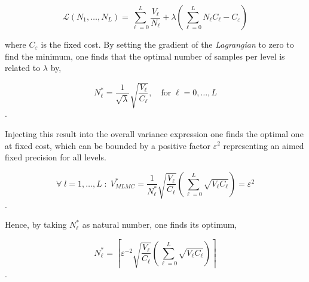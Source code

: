 \begin{equation}\label{eq:mlmc_lagrangian}
\mathcal{L}(N_1, \dots, N_L) = \sum_{\ell=0}^L \frac{V_\ell}{N_\ell} + \lambda \left( \sum_{\ell=0}^L N_\ell C_\ell  - C_{\varepsilon} \right)
\end{equation}

where $C_{\varepsilon}$ is the fixed cost.
By setting the gradient of the \textit{Lagrangian} to zero to find the minimum, one finds that the optimal number of samples per level is related to $\lambda$ by,

\begin{equation}\label{eq:mlmc_lambda}
N_\ell^* = \frac{1}{\sqrt{\lambda}}\sqrt{\frac{V_\ell}{C_\ell}}, \quad \text{for} \; \ell = 0,\dots,L 
\end{equation}.

Injecting this result into the overall variance expression one finds the optimal one at fixed cost, which can be bounded by a positive factor $\varepsilon^2$ representing an aimed fixed precision for all levels.

\begin{equation}\label{eq:mlmc_opt_variance}
\forall \; l=1,\dots,L \; : \;V_{MLMC}^* = \frac{1}{N_\ell^*}\sqrt{\frac{V_\ell}{C_\ell}} \left(\sum_{\ell=0}^L \sqrt{V_\ell C_\ell} \right) = \varepsilon^2
\end{equation}.

Hence, by taking $N_\ell^*$ as natural number, one finds its optimum,

\begin{equation}\label{eq:mlmc_opt_number}
N_\ell^* = \left\lceil \varepsilon^{-2} \sqrt{\frac{V_\ell}{C_\ell}} \left(\sum_{\ell=0}^L \sqrt{V_\ell C_\ell} \right) \right\rceil
\end{equation}.

